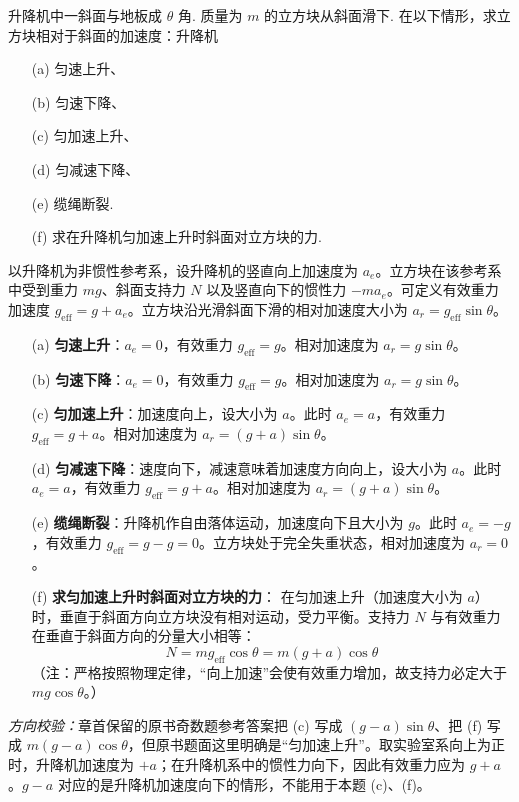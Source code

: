\begin{exercise}\label{ex:3.3}
升降机中一斜面与地板成 $\theta$ 角. 质量为 $m$ 的立方块从斜面滑下. 在以下情形，求立方块相对于斜面的加速度：升降机
\begin{enumerate}
  \item[(a)] 匀速上升、
  \item[(b)] 匀速下降、
  \item[(c)] 匀加速上升、
  \item[(d)] 匀减速下降、
  \item[(e)] 缆绳断裂.
  \item[(f)] 求在升降机匀加速上升时斜面对立方块的力.
\end{enumerate}
\end{exercise}
\begin{solution}
以升降机为非惯性参考系，设升降机的竖直向上加速度为 $a_e$。立方块在该参考系中受到重力 $mg$、斜面支持力 $N$ 以及竖直向下的惯性力 $-m a_e$。可定义有效重力加速度 $g_{\mathrm{eff}} = g + a_e$。立方块沿光滑斜面下滑的相对加速度大小为 $a_r = g_{\mathrm{eff}} \sin\theta$。

\begin{enumerate}
    \item[(a)] \textbf{匀速上升}：$a_e = 0$，有效重力 $g_{\mathrm{eff}} = g$。相对加速度为 $a_r = g \sin\theta$。
    \item[(b)] \textbf{匀速下降}：$a_e = 0$，有效重力 $g_{\mathrm{eff}} = g$。相对加速度为 $a_r = g \sin\theta$。
    \item[(c)] \textbf{匀加速上升}：加速度向上，设大小为 $a$。此时 $a_e = a$，有效重力 $g_{\mathrm{eff}} = g + a$。相对加速度为 $a_r = (g + a) \sin\theta$。
    \item[(d)] \textbf{匀减速下降}：速度向下，减速意味着加速度方向向上，设大小为 $a$。此时 $a_e = a$，有效重力 $g_{\mathrm{eff}} = g + a$。相对加速度为 $a_r = (g + a) \sin\theta$。
    \item[(e)] \textbf{缆绳断裂}：升降机作自由落体运动，加速度向下且大小为 $g$。此时 $a_e = -g$，有效重力 $g_{\mathrm{eff}} = g - g = 0$。立方块处于完全失重状态，相对加速度为 $a_r = 0$。
    \item[(f)] \textbf{求匀加速上升时斜面对立方块的力}：
    在匀加速上升（加速度大小为 $a$）时，垂直于斜面方向立方块没有相对运动，受力平衡。支持力 $N$ 与有效重力在垂直于斜面方向的分量大小相等：
    $$ N = m g_{\mathrm{eff}} \cos\theta = m(g + a) \cos\theta $$
    （注：严格按照物理定律，“向上加速”会使有效重力增加，故支持力必定大于 $mg\cos\theta$。）
\end{enumerate}

\textit{方向校验：}章首保留的原书奇数题参考答案把 (c) 写成 $(g-a)\sin\theta$、把 (f) 写成 $m(g-a)\cos\theta$，但原书题面这里明确是“匀加速上升”。取实验室系向上为正时，升降机加速度为 $+a$；在升降机系中的惯性力向下，因此有效重力应为 $g+a$。$g-a$ 对应的是升降机加速度向下的情形，不能用于本题 (c)、(f)。
\end{solution}

